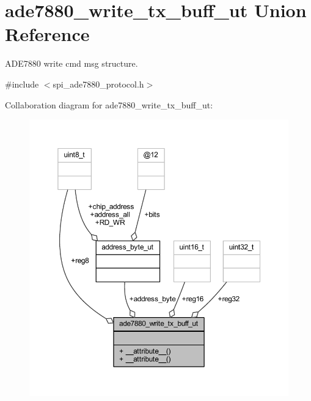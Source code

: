 \hypertarget{a00020}{\section{ade7880\-\_\-write\-\_\-tx\-\_\-buff\-\_\-ut Union Reference}
\label{db/db2/a00020}
}


A\-D\-E7880 write cmd msg structure.  




{\ttfamily \#include $<$spi\-\_\-ade7880\-\_\-protocol.\-h$>$}



Collaboration diagram for ade7880\-\_\-write\-\_\-tx\-\_\-buff\-\_\-ut\-:\nopagebreak
\begin{figure}[H]
\begin{center}
\leavevmode
\includegraphics[width=350pt]{d9/da4/a00078}
\end{center}
\end{figure}
